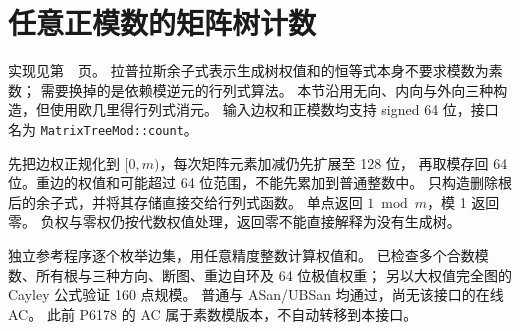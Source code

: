 \section{任意正模数的矩阵树计数}
实现见第~\pageref{compact-MatrixTreeMod}~页。
拉普拉斯余子式表示生成树权值和的恒等式本身不要求模数为素数；
需要换掉的是依赖模逆元的行列式算法。
本节沿用无向、内向与外向三种构造，但使用欧几里得行列式消元。
输入边权和正模数均支持 signed 64 位，接口名为
\texttt{MatrixTreeMod::count}。

先把边权正规化到 $[0,m)$，每次矩阵元素加减仍先扩展至 128 位，
再取模存回 64 位。重边的权值和可能超过 64 位范围，不能先累加到普通整数中。
只构造删除根后的余子式，并将其存储直接交给行列式函数。
单点返回 $1\bmod m$，模 1 返回零。
负权与零权仍按代数权值处理，返回零不能直接解释为没有生成树。

独立参考程序逐个枚举边集，用任意精度整数计算权值和。
已检查多个合数模数、所有根与三种方向、断图、重边自环及 64 位极值权重；
另以大权值完全图的 Cayley 公式验证 160 点规模。
普通与 ASan/UBSan 均通过，尚无该接口的在线 AC。
此前 P6178 的 AC 属于素数模版本，不自动转移到本接口。

